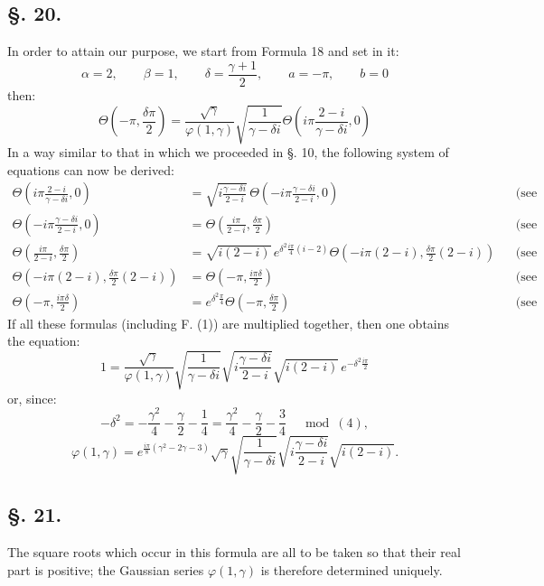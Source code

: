 \documentclass[10pt]{article}
\newcommand{\sourceanchor}[1]{\hypertarget{source-#1}{}}
\begin{document}
\subsection*{\S. 20.}
In order to attain our purpose, we start from Formula 18 and set in it:
\[
\alpha=2,
\qquad \beta=1,
\qquad \delta=\frac{\gamma+1}{2},
\qquad a=-\pi,
\qquad b=0
\]
then:
\begin{equation*}
\Theta\!\left(-\pi,\frac{\delta\pi}{2}\right)
=\frac{\sqrt{\gamma}}{\varphi(1,\gamma)}
\sqrt{\frac{1}{\gamma-\delta i}}
\Theta\!\left(i\pi\frac{2-i}{\gamma-\delta i},0\right)
\tag{1}
\end{equation*}
In a way similar to that in which we proceeded in \S. 10, the following system of equations can now be derived:
\sourceanchor{PA17}
\begin{align*}
\Theta\!\left(i\pi\frac{2-i}{\gamma-\delta i},0\right)
&=\sqrt{i\frac{\gamma-\delta i}{2-i}}\,
\Theta\!\left(-i\pi\frac{\gamma-\delta i}{2-i},0\right) &&\text{(see F. 7.)}\\
\Theta\!\left(-i\pi\frac{\gamma-\delta i}{2-i},0\right)
&=\Theta\!\left(\frac{i\pi}{2-i},\frac{\delta\pi}{2}\right) &&\text{(see F. 5.)}\\
\Theta\!\left(\frac{i\pi}{2-i},\frac{\delta\pi}{2}\right)
&=\sqrt{i(2-i)}\,e^{\delta^{2}\frac{i\pi}{4}(i-2)}
\Theta\!\left(-i\pi(2-i),\frac{\delta\pi}{2}(2-i)\right) &&\text{(see F. 7.)}\\
\Theta\!\left(-i\pi(2-i),\frac{\delta\pi}{2}(2-i)\right)
&=\Theta\!\left(-\pi,\frac{i\pi\delta}{2}\right) &&\text{(see F. 1 and 4.)}\\
\Theta\!\left(-\pi,\frac{i\pi\delta}{2}\right)
&=e^{\delta^{2}\frac{\pi}{4}}\Theta\!\left(-\pi,\frac{\delta\pi}{2}\right) &&\text{(see F. 7.)}
\end{align*}
If all these formulas (including F. (1)) are multiplied together, then one obtains the equation:
\[
1=\frac{\sqrt{\gamma}}{\varphi(1,\gamma)}
\sqrt{\frac{1}{\gamma-\delta i}}
\sqrt{i\frac{\gamma-\delta i}{2-i}}
\sqrt{i(2-i)}\,e^{-\delta^{2}\frac{i\pi}{2}}
\]
or, since:
\[
-\delta^{2}=-\frac{\gamma^{2}}{4}-\frac{\gamma}{2}-\frac{1}{4}
=\frac{\gamma^{2}}{4}-\frac{\gamma}{2}-\frac{3}{4}\quad \bmod(4),
\]
\begin{equation*}
\varphi(1,\gamma)=e^{\frac{i\pi}{8}(\gamma^{2}-2\gamma-3)}
\sqrt{\gamma}\sqrt{\frac{1}{\gamma-\delta i}}
\sqrt{i\frac{\gamma-\delta i}{2-i}}
\sqrt{i(2-i)}.
\tag{20}
\end{equation*}

\subsection*{\S. 21.}
The square roots which occur in this formula are all to be taken so that their real part is positive; the Gaussian series \(\varphi(1,\gamma)\) is therefore determined uniquely.
\end{document}
